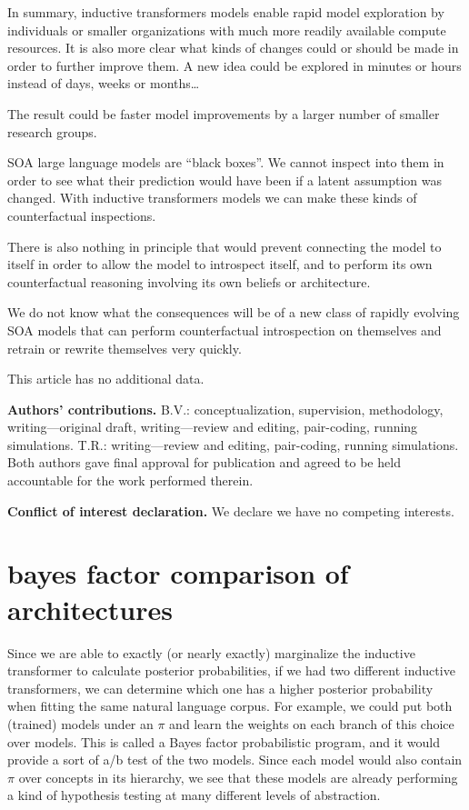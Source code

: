 In summary, inductive transformers models enable rapid model exploration by individuals or smaller organizations with much more readily available compute resources. It is also more clear what kinds of changes could or should be made in order to further improve them.  A new idea could be explored in minutes or hours instead of days, weeks or months…

The result could be faster model improvements by a larger number of smaller research groups.

SOA large language models are “black boxes”.  We cannot inspect into them in order to see what their prediction would have been if a latent assumption was changed.  With inductive transformers models we can make these kinds of counterfactual inspections.


There is also nothing in principle that would prevent connecting the model to itself in order to allow the model to introspect itself, and to perform its own counterfactual reasoning involving its own beliefs or architecture.

We do not know what the consequences will be of a new class of rapidly evolving SOA models that can perform counterfactual introspection on themselves and retrain or rewrite themselves very quickly. 




This article has no additional data.

\textbf{Authors’ contributions.} B.V.:  conceptualization, supervision, methodology, writing—original draft, writing—review and editing, pair-coding, running simulations. T.R.:  writing—review and editing, pair-coding, running simulations.  Both authors gave final approval for publication and agreed to be held accountable for the work performed therein.

\textbf{Conflict of interest declaration.} We declare we have no competing interests.


\section{bayes factor comparison of architectures}

Since we are able to exactly (or nearly exactly) marginalize the inductive transformer to calculate posterior probabilities, if we had two different inductive transformers, we can determine which one has a higher posterior probability when fitting the same natural language corpus.  For example, we could put both (trained) models under an $\pi$ and learn the weights on each branch of this choice over models.  This is called a Bayes factor probabilistic program, and it would provide a sort of a/b test of the two models.  Since each model would also contain $\pi$ over concepts in its hierarchy, we see that these models are already performing a kind of hypothesis testing at many different levels of abstraction.


